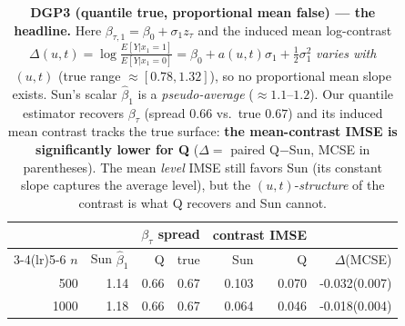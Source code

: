 \begin{table}[t]\centering\small
\caption{\textbf{DGP3 (quantile true, proportional mean false) --- the headline.} Here $\beta_{\tau,1}=\beta_0+\sigma_1 z_\tau$ and the induced mean log-contrast $\Delta(u,t)=\log\frac{E[Y|x_1=1]}{E[Y|x_1=0]}=\beta_0+a(u,t)\sigma_1+\tfrac12\sigma_1^2$ \emph{varies with $(u,t)$} (true range $\approx[0.78,1.32]$), so no proportional mean slope exists. Sun's scalar $\widehat\beta_1$ is a \emph{pseudo-average} ($\approx1.1$--$1.2$). Our quantile estimator recovers $\beta_\tau$ (spread $0.66$ vs.\ true $0.67$) and its induced mean contrast tracks the true surface: \textbf{the mean-contrast IMSE is significantly lower for Q} ($\Delta=$ paired Q$-$Sun, MCSE in parentheses). The mean \emph{level} IMSE still favors Sun (its constant slope captures the average level), but the $(u,t)$-\emph{structure} of the contrast is what Q recovers and Sun cannot.}
\label{tab:cmpC}\begin{tabular}{rr rr rr r}\toprule
&&\multicolumn{2}{c}{$\beta_\tau$ spread}&\multicolumn{2}{c}{contrast IMSE}&\\
\cmidrule(lr){3-4}\cmidrule(lr){5-6}
$n$&Sun $\widehat\beta_1$&Q&true&Sun&Q&$\Delta$(MCSE)\\\midrule
500 & 1.14 & 0.66 & 0.67 & 0.103 & 0.070 & -0.032(0.007) \\
1000 & 1.18 & 0.66 & 0.67 & 0.064 & 0.046 & -0.018(0.004) \\
\bottomrule\end{tabular}\end{table}
